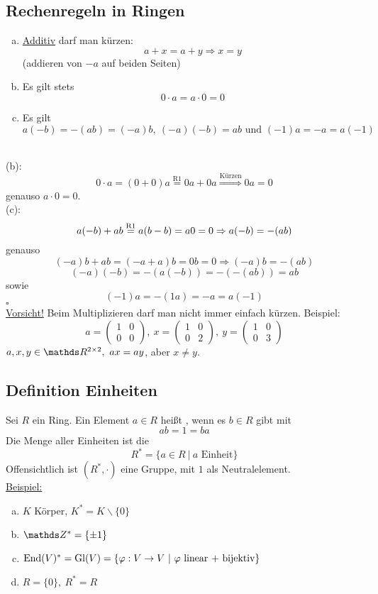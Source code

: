 \subsection{Rechenregeln in Ringen}
\label{sub:rechenregeln_ringen}
\begin{enumerate}[(a)]
	\item \uline{Additiv} darf man kürzen:
	\[
	a+x=a+y\Rightarrow x=y
	\]
	(addieren von $-a$ auf beiden Seiten)
	\item Es gilt stets 
	\[
	0\cdot a=a\cdot 0=0
	\]
	\item Es gilt 
	\[
	a(-b)=-(ab)=(-a)b,~ (-a)(-b)=ab \text{ und } (-1)a=-a=a(-1)
	\]
\end{enumerate}

\\
(b):
\[
0\cdot a =(0+0)a\stackrel{\text{R1}}{=}0a+0a\stackrel{\text{Kürzen}}{\Rightarrow} 0a=0
\]
genauso $a\cdot 0=0$.\\
(c): 
\[
a(-b)+ab\stackrel{\text{R1}}{=} a(b-b)=a0=0\Rightarrow a(-b)=-(ab)
\]
genauso
\[
(-a)b+ab=(-a+a)b=0b=0\Rightarrow (-a)b=-(ab)
\]
\[
(-a)(-b)=-(a(-b))=-(-(ab))=ab
\]
sowie
\[
(-1)a=-(1a)=-a=a(-1)
\]
\hfill $\square$\\
\uline{Vorsicht!} Beim Multiplizieren darf man nicht immer einfach kürzen. 
Beispiel:
\[
a=\begin{pmatrix}1&0\\0&0\end{pmatrix},~x=\begin{pmatrix}1&0\\0&2\end{pmatrix},~y=\begin{pmatrix}1&0\\0&3\end{pmatrix}
\]
$a,x,y\in \R^{2\times 2},~ ax=ay$, aber $x\neq y$.

\subsection{Definition Einheiten}
\label{sub:def_einheiten}
Sei $R$ ein Ring. 
Ein Element $a\in R$ heißt , wenn es $b\in R$ gibt mit 
\[
ab=1=ba
\]
Die Menge aller Einheiten ist die 
\[
R^*=\{a\in R~|~a\text{ Einheit}\}
\]
Offensichtlich ist $(R^*,\cdot)$ eine Gruppe, mit $1$ als Neutralelement.\\

\uline{Beispiel:}
\begin{enumerate}[(a)]
	\item $K$ Körper, $K^*=K\backslash \{0\}$
	\item $\Z^*=\{\pm 1\}$
	\item $\operatorname{End}(V)^*=\operatorname{Gl}(V)=\{\varphi:V\to V~|~\varphi\text{ linear + bijektiv}\}$
	\item $R=\{0\},~R^*=R$
\end{enumerate}


